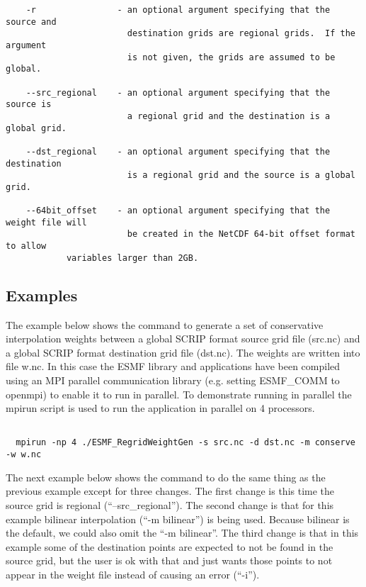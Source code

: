 \begin{verbatim}
    -r                - an optional argument specifying that the source and 
                        destination grids are regional grids.  If the argument
                        is not given, the grids are assumed to be global.

    --src_regional    - an optional argument specifying that the source is 
                        a regional grid and the destination is a global grid.  

    --dst_regional    - an optional argument specifying that the destination 
                        is a regional grid and the source is a global grid.  

    --64bit_offset    - an optional argument specifying that the weight file will
                        be created in the NetCDF 64-bit offset format to allow
			variables larger than 2GB.
\end{verbatim}


\subsection{Examples}

The example below shows the command to generate a set of conservative interpolation weights between a global 
SCRIP format source grid file (src.nc) and a global SCRIP format destination grid file (dst.nc). The weights
are written into file w.nc. In this case the
ESMF library and applications have been compiled using an MPI parallel communication library 
(e.g. setting ESMF\_COMM to openmpi) to enable it to run in parallel. To demonstrate running in parallel
the mpirun script is used to run the application in parallel on 4 processors. 

\begin{verbatim}

  mpirun -np 4 ./ESMF_RegridWeightGen -s src.nc -d dst.nc -m conserve -w w.nc

\end{verbatim}

The next example below shows the command to do the same thing as the previous example except for three changes. The first 
change is this time the source grid is regional (``--src\_regional''). The second change is that
for this example bilinear interpolation (``-m bilinear'') is being used. Because bilinear is the default, we could also
omit the ``-m bilinear''. The third change is that in this example some of the destination points are expected to
not be found in the source grid, but the user is ok with that and just wants those points to not appear in the weight file instead of causing an error (``-i''). 


